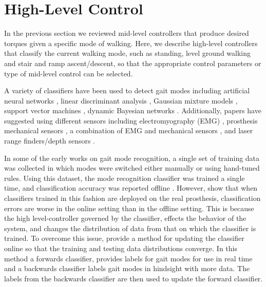 \section{High-Level Control}\label{sec:back_high_level_control}

In the previous section we reviewed mid-level controllers that produce desired
torques given a specific mode of walking. Here, we describe high-level
controllers that classify the current walking mode, such as standing, level
ground walking and stair and ramp ascent/descent, so that the appropriate
control parameters or type of mid-level control can be selected. 

A variety of classifiers have been used to detect gait modes including
artificial neural networks \citep{huang2009strategy}, linear discriminant
analysis
\citep{huang2009strategy,huang2011continuous,hargrove2015intuitive,young2014intent},
Gaussian mixture models \citep{varol2010multiclass}, support vector machines
\citep{huang2011continuous,massalin2017user,yan2018locomotion}, dynamic Bayesian
networks \citep{young2014intent,hargrove2015intuitive,spanias2018online}.
Additionally, papers have suggested using different sensors including
electromyography (EMG) \citep{huang2009strategy}, prosthesis mechanical sensors
\citep{varol2010multiclass,young2014intent,young2014training}, a combination of
EMG and mechanical sensors
\citep{huang2011continuous,spanias2018online,hargrove2015intuitive}, and laser
range finders/depth sensors
\citep{zhang2011preliminary,liu2016development,massalin2017user,yan2018locomotion}.

In some of the early works on gait mode recognition, a single set of training
data was collected in which modes were switched either manually or using
hand-tuned rules. Using this dataset, the mode recognition classifier was
trained a single time, and classification accuracy was reported offline
\citep{huang2009strategy,huang2011continuous,young2014intent}. However,
\citet{hargrove2015intuitive} show that when classifiers trained in this fashion
are deployed on the real prosthesis, classification errors are worse in the
online setting than in the offline setting. This is because the high
level-controller governed by the classifier, effects the behavior of the system,
and changes the distribution of data from that on which the classifier is
trained. To overcome this issue, \citet{spanias2018online} provide a method for
updating the classifier online so that the training and testing data
distributions converge. In this method a forwards classifier, provides labels
for gait modes for use in real time and a backwards classifier labels gait modes
in hindsight with more data. The labels from the backwards classifier are then
used to update the forward classifier. 
